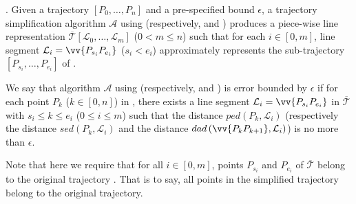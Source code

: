 
. Given a trajectory $\left[P_0, \dots, P_n\right]$ and  a pre-specified bound $\epsilon$, a trajectory simplification algorithm $\mathcal{A}$ using \ped  (respectively, \sed and \dad) produces a piece-wise line representation $\overline{\mathcal{T}}\left[\mathcal{L}_0, \ldots, \mathcal{L}_m\right]$ ($0< m \le n$) such that for each $i\in[0, m]$, line segment $\mathcal{L}_i = \vv{P_{s_i}P_{e_i}}$ ($s_i < e_i$) approximately represents the sub-trajectory $\left[P_{s_i}, \dots, P_{e_i}\right]$ of .

We say that algorithm $\mathcal{A}$  using \ped  (respectively, \sed and \dad) is error bounded by $\epsilon$ if for each point $P_k$ ($k\in[0,n]$) in , there exists a line segment $\mathcal{L}_i = \vv{P_{s_i}P_{e_i}}$  in $\overline{\mathcal{T}}$ with $s_i \le k \le e_i$ ($0\le i\le m$) such that the \ped distance $ped\left(P_k, \mathcal{L}_i\right)$  (respectively the \sed distance $sed\left(P_k, \mathcal{L}_i\right)$  and the \dad distance $dad\left(\vv{P_{k}P_{k+1}}, \mathcal{L}_i\right)$) is no more than  $\epsilon$.

 Note that here we require that for all $i\in[0,m]$, points $P_{s_i}$ and $P_{e_i}$ of $\overline{\mathcal{T}}$ belong to the original trajectory . That is to say, all points in the simplified trajectory belong to the original trajectory.

